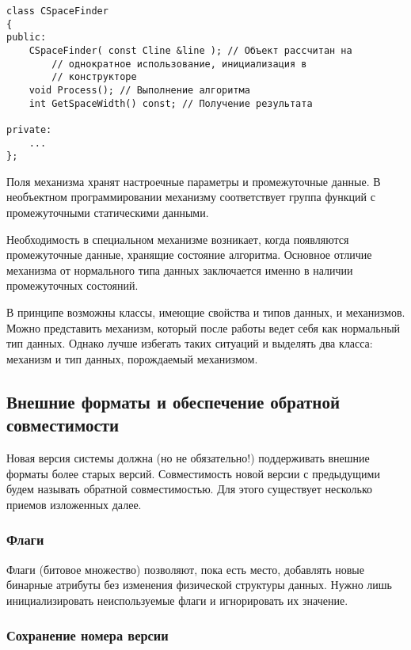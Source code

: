 \begin{lstlisting}[frame=single]
class CSpaceFinder
{
public:
    CSpaceFinder( const Cline &line ); // Объект рассчитан на 
        // однократное использование, инициализация в
        // конструкторе
    void Process(); // Выполнение алгоритма
    int GetSpaceWidth() const; // Получение результата

private:
    ...
};
\end{lstlisting}

Поля механизма хранят настроечные параметры и промежуточные данные. В необъектном программировании механизму соответствует группа функций с промежуточными статическими данными.

Необходимость в специальном механизме возникает, когда появляются промежуточные данные, хранящие состояние алгоритма. Основное отличие механизма от нормального типа данных заключается именно в наличии промежуточных состояний.

В принципе возможны классы, имеющие свойства и типов данных, и механизмов. Можно представить механизм, который после работы ведет себя как нормальный тип данных. Однако лучше избегать таких ситуаций и выделять два класса: механизм и тип данных, порождаемый механизмом. 

\newpage
\subsection{Внешние форматы и обеспечение обратной совместимости}

Новая версия системы должна (но не обязательно!) поддерживать внешние форматы более старых версий. Совместимость новой версии с предыдущими будем называть обратной совместимостью. Для этого существует несколько приемов изложенных далее.

\subsubsection{Флаги}

Флаги (битовое множество) позволяют, пока есть место, добавлять новые бинарные атрибуты без изменения физической структуры данных. Нужно лишь инициализировать неиспользуемые флаги и игнорировать их значение.

\subsubsection{Сохранение номера версии}

